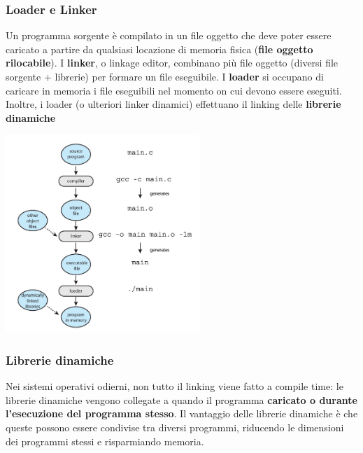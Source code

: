 \documentclass[12pt]{article}
\begin{document}
\subsubsection{Loader e Linker}
Un programma sorgente è compilato in un file oggetto che deve poter essere caricato a partire da qualsiasi locazione di memoria fisica (\textbf{file oggetto rilocabile}).
I \textbf{linker}, o linkage editor, combinano più file oggetto (diversi file sorgente + librerie) per formare un file eseguibile. I \textbf{loader} si occupano di caricare in memoria i file eseguibili nel momento
on cui devono essere eseguiti. Inoltre, i loader (o ulteriori linker dinamici) effettuano il linking delle \textbf{librerie dinamiche}
\begin{center}
    \includegraphics[width = 0.55\textwidth]{Images/19.png}
\end{center}
\subsubsection{Librerie dinamiche}
Nei sistemi operativi odierni, non tutto il linking viene fatto a compile time: le librerie dinamiche vengono collegate a quando il programma \textbf{caricato o durante l'esecuzione del programma stesso}.
Il vantaggio delle librerie dinamiche è che queste possono essere condivise tra diversi programmi, riducendo le dimensioni dei programmi stessi e risparmiando memoria.
\end{document}
